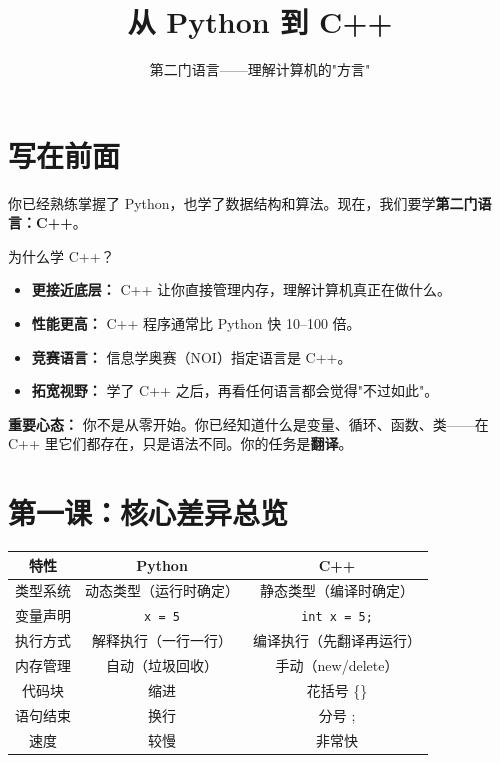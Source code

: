 \documentclass[a4paper,12pt]{ctexart}
\title{\textcolor{blue!70!black}{\Huge\textbf{从 Python 到 C++}}}
\author{第二门语言——理解计算机的"方言"}
\date{}
\begin{document}
\maketitle
\thispagestyle{empty}

\section*{写在前面}

你已经熟练掌握了 Python，也学了数据结构和算法。现在，我们要学\textbf{第二门语言：C++}。

为什么学 C++？
\begin{itemize}
  \item \textbf{更接近底层：} C++ 让你直接管理内存，理解计算机真正在做什么。
  \item \textbf{性能更高：} C++ 程序通常比 Python 快 10--100 倍。
  \item \textbf{竞赛语言：} 信息学奥赛（NOI）指定语言是 C++。
  \item \textbf{拓宽视野：} 学了 C++ 之后，再看任何语言都会觉得"不过如此"。
\end{itemize}

\textbf{重要心态：} 你不是从零开始。你已经知道什么是变量、循环、函数、类——在 C++ 里它们都存在，只是语法不同。你的任务是\textbf{翻译}。

\section*{第一课：核心差异总览}

\begin{center}
\begin{tabular}{|c|c|c|}
\hline
\textbf{特性} & \textbf{Python} & \textbf{C++} \\ \hline
类型系统 & 动态类型（运行时确定） & 静态类型（编译时确定） \\ \hline
变量声明 & \texttt{x = 5} & \texttt{int x = 5;} \\ \hline
执行方式 & 解释执行（一行一行） & 编译执行（先翻译再运行） \\ \hline
内存管理 & 自动（垃圾回收） & 手动（new/delete） \\ \hline
代码块 & 缩进 & 花括号 \{\} \\ \hline
语句结束 & 换行 & 分号 ; \\ \hline
速度 & 较慢 & 非常快 \\ \hline
\end{tabular}
\end{center}
\end{document}

